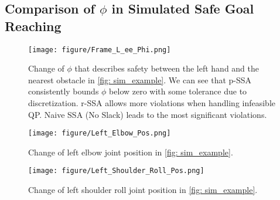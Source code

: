
\subsection{Comparison of $\phi$ in Simulated Safe Goal Reaching}\label{append:phi_compare}

\begin{figure}[h]
    \centering
    \texttt{[image: figure/Frame\_L\_ee\_Phi.png]}
    \caption{Change of $\phi$ that describes safety between the left hand and the nearest obstacle in \cref{fig: sim_example}. We can see that p-SSA consistently bounds $\phi$ below zero with some tolerance due to discretization. r-SSA allows more violations when handling infeasible QP. Naive SSA (No Slack) leads to the most significant violations.}
    \label{fig:l_ee_phi}
\end{figure}

\begin{figure}[h]
    \centering
    \texttt{[image: figure/Left\_Elbow\_Pos.png]}
    \caption{Change of left elbow joint position in \cref{fig: sim_example}.}
    \label{fig:l_elbow_pos}
\end{figure}

\begin{figure}[h]
    \centering
    \texttt{[image: figure/Left\_Shoulder\_Roll\_Pos.png]}
    \caption{Change of left shoulder roll joint position in \cref{fig: sim_example}.}
    \label{fig:l_shoulder_roll}
\end{figure}